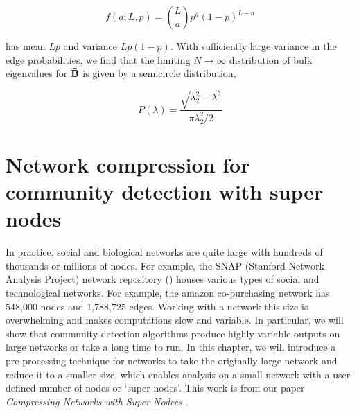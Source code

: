 \begin{equation}
f(a;L,p)={L \choose a}p^{a}(1-p)^{L-a}
\end{equation}

has mean $Lp$ and variance $Lp(1-p)$. With sufficiently large variance in the edge probabilities, we find that the limiting $N\rightarrow \infty$ distribution of bulk eigenvalues for ${\bf \bar{B}}$ is given by a semicircle distribution,

\begin{equation}
P(\lambda)=\frac{\sqrt{\lambda^2_{2}-\lambda^{2}}}{\pi \lambda_{2}^{2}/2}
\end{equation}

\chapter{Network compression for community detection with super nodes}
\indent In practice, social and biological networks are quite large with hundreds of thousands or millions of nodes. For example, the SNAP (Stanford Network Analysis Project) network repository (\cite{https://snap.stanford.edu/data/}) houses various types of social and technological networks. For example, the amazon co-purchasing network has 548,000 nodes and 1,788,725 edges. Working with a network this size is overwhelming and makes computations slow and variable. In particular, we will show that community detection algorithms produce highly variable outputs on large networks or take a long time to run. In this chapter, we will introduce a pre-processing technique for networks to take the originally large network and reduce it to a smaller size, which enables analysis on a small network with a user-defined number of nodes or `super nodes'. This work is from our paper \emph{Compressing Networks with Super Nodees} \cite{compressing}.

